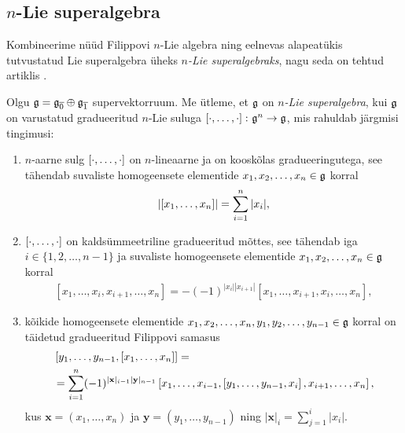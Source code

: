 \subsection{\texorpdfstring{$n$}{n}-Lie superalgebra}

Kombineerime nüüd Filippovi $n$-Lie algebra ning eelnevas alapeatükis
tutvustatud Lie superalgebra üheks \emph{$n$-Lie superalgebraks}, nagu
seda on tehtud artiklis \cite{Abramov:2014}.

\begin{dfn}\label{def:n-Lie-superalgebra}
    Olgu $\mathfrak{g} = \mathfrak{g}_{\overline{0}} \oplus \mathfrak{g}_{\overline{1}}$
    supervektorruum. Me ütleme, et $\mathfrak{g}$ on
    \emph{$n$-Lie superalgebra}, kui $\mathfrak{g}$ on varustatud
    gradueeritud $n$-Lie suluga $\left[ \cdot, \dots, \cdot \right] \colon \mathfrak{g}^n \to \mathfrak{g}$,
    mis rahuldab järgmisi tingimusi:
    \begin{enumerate}
        \item $n$-aarne sulg $\left[ \cdot, \dots, \cdot \right]$ on $n$-lineaarne ja on
            kooskõlas gradueeringutega, see tähendab suvaliste
            homogeensete elementide $x_1, x_2, \dots, x_n \in \mathfrak{g}$ korral
            \begin{align}\label{def:n-lie-superalg-brac-grading}
                \left| \left[ x_1, \dots, x_n \right] \right| = \sum_{i=1}^n |x_i|,
            \end{align}
        \item $\left[ \cdot, \dots, \cdot \right]$ on kaldsümmeetriline gradueeritud mõttes,
            see tähendab iga $i \in \{1, 2, \dots, n-1\}$ ja suvaliste
            homogeensete elementide $x_1, x_2, \dots, x_n \in \mathfrak{g}$ korral
            \begin{align}\label{def:n-lie-superalg-brac-antikomm}
                \left[ x_1, \dots, x_i, x_{i+1}, \dots, x_n \right] =
                -(-1)^{|x_i| |x_{i+1}|} \left[
                    x_1, \dots, x_{i+1}, x_i, \dots, x_n
                \right],
            \end{align}
        \item kõikide homogeensete elementide
            $x_1, x_2, \dots, x_n, y_1, y_2, \dots, y_{n-1} \in \mathfrak{g}$ korral
            on täidetud gradueeritud Filippovi samasus
            \begin{align}\begin{split}\label{id:graded-filippov}
                &\left[ y_1, \dots, y_{n-1}, \left[ x_1, \dots, x_n \right] \right] = \\
                &= \sum_{i=1}^n (-1)^{|\mathbf{x}|_{i-1} |\mathbf{y}|_{n-1}}
                \left[
                    x_1, \dots, x_{i-1},
                    \left[ y_1, \dots, y_{n-1}, x_i \right],
                    x_{i+1}, \dots, x_n
                \right],
            \end{split}\end{align}
            kus $\mathbf{x} = (x_1, \dots, x_n)$ ja
            $\mathbf{y} = (y_1, \dots, y_{n-1})$ ning
            $|\mathbf{x}|_i = \sum_{j=1}^{i} |x_i|$.
    \end{enumerate}
\end{dfn}

